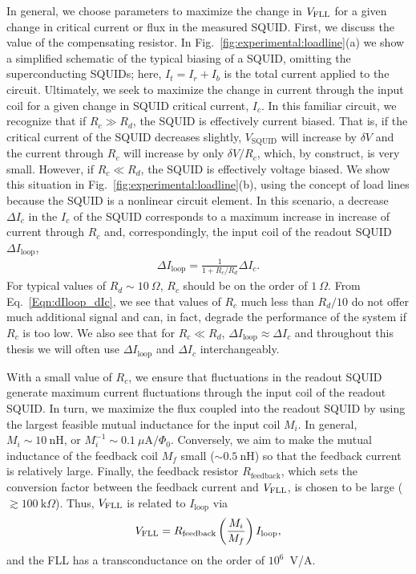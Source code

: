 In general, we choose parameters to maximize the change in $V_\text{FLL}$ for a given change in critical current or flux in the measured SQUID. First, we discuss the value of the compensating resistor. In Fig.~\ref{fig:experimental:loadline}(a) we show a simplified schematic of the typical biasing of a SQUID, omitting the superconducting SQUIDs; here, $I_t = I_r + I_b$ is the total current applied to the circuit. Ultimately, we seek to maximize the change in current through the input coil for a given change in SQUID critical current, $I_c$. In this familiar circuit, we recognize that if $R_c \gg R_d$, the SQUID is effectively current biased. That is, if the critical current of the SQUID decreases slightly, $V_{\text{SQUID}}$ will increase by $\delta V$ and the current through $R_c$ will increase by only $\delta V/R_c$, which, by construct, is very small. However, if $R_c \ll R_d$, the SQUID is effectively voltage biased. We show this situation in Fig.~\ref{fig:experimental:loadline}(b), using the concept of load lines because the SQUID is a nonlinear circuit element. In this scenario, a decrease $\Delta I_c$ in the $I_c$ of the SQUID corresponds to a maximum increase in increase of current through $R_c$ and, correspondingly, the input coil of the readout SQUID $\Delta I_{\text{loop}}$,
\begin{align}\label{Eqn:dIloop_dIc}
\Delta I_{\text{loop}} = \frac{1}{1+R_c/R_d} \Delta I_c.
\end{align}
For typical values of $R_d \sim 10~\Omega$, $R_c$ should be on the order of $1~\Omega$. From Eq.~\eqref{Eqn:dIloop_dIc}, we see that values of $R_c$ much less than $R_d/10$ do not offer much additional signal and can, in fact, degrade the performance of the system if $R_c$ is too low. We also see that for $R_c \ll R_d$, $\Delta I_{\text{loop}} \approx \Delta I_c$ and throughout this thesis we will often use $\Delta I_{\text{loop}}$ and $\Delta I_c$ interchangeably.

With a small value of $R_c$, we ensure that fluctuations in the readout SQUID generate maximum current fluctuations through the input coil of the readout SQUID. In turn, we maximize the flux coupled into the readout SQUID by using the largest feasible mutual inductance for the input coil $M_i$. In general, $M_i \sim 10~\text{nH}$, or $M_i^{-1} \sim 0.1~\mu\text{A}/\Phi_0$. Conversely, we aim to make the mutual inductance of the feedback coil $M_f$ small ($\sim 0.5~$nH) so that the feedback current is relatively large. Finally, the feedback resistor $R_{\text{feedback}}$, which sets the conversion factor between the feedback current and $V_\text{FLL}$, is chosen to be large ($\gtrsim 100~\text{k}\Omega$). Thus, $V_\text{FLL}$ is related to $I_{\text{loop}}$ via
\begin{align}\label{fig:experimental:Vfll_Iloop}
V_\text{FLL} = R_{\text{feedback}} \left( \frac{M_i}{M_f} \right) I_{\text{loop}},
\end{align}
and the FLL has a transconductance on the order of $10^6$~V/A.


